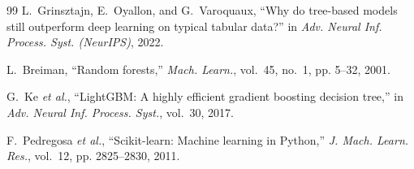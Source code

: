 \documentclass[conference,spanish]{IEEEtran}
\begin{document}
\begin{thebibliography}{99}
L.~Grinsztajn, E.~Oyallon, and G.~Varoquaux,
``Why do tree-based models still outperform deep learning on typical tabular data?''
in \textit{Adv. Neural Inf. Process. Syst. (NeurIPS)}, 2022.

L.~Breiman,
``Random forests,''
\textit{Mach. Learn.}, vol.~45, no.~1, pp. 5--32, 2001.

G.~Ke \textit{et al.},
``LightGBM: A highly efficient gradient boosting decision tree,''
in \textit{Adv. Neural Inf. Process. Syst.}, vol.~30, 2017.

F.~Pedregosa \textit{et al.},
``Scikit-learn: Machine learning in Python,''
\textit{J. Mach. Learn. Res.}, vol.~12, pp. 2825--2830, 2011.

\end{thebibliography}
\end{document}
